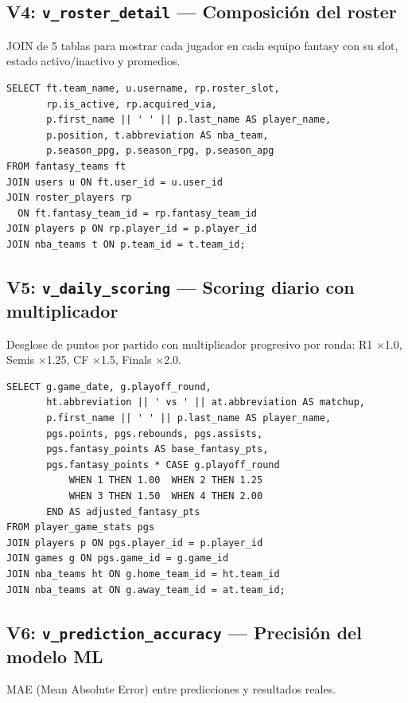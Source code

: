 \documentclass[12pt,a4paper]{article}
\begin{document}
\subsection{V4: \texttt{v\_roster\_detail} --- Composici\'on del roster}

JOIN de 5 tablas para mostrar cada jugador en cada equipo fantasy con su slot,
estado activo/inactivo y promedios.

\begin{lstlisting}
SELECT ft.team_name, u.username, rp.roster_slot,
       rp.is_active, rp.acquired_via,
       p.first_name || ' ' || p.last_name AS player_name,
       p.position, t.abbreviation AS nba_team,
       p.season_ppg, p.season_rpg, p.season_apg
FROM fantasy_teams ft
JOIN users u ON ft.user_id = u.user_id
JOIN roster_players rp
  ON ft.fantasy_team_id = rp.fantasy_team_id
JOIN players p ON rp.player_id = p.player_id
JOIN nba_teams t ON p.team_id = t.team_id;
\end{lstlisting}

\subsection{V5: \texttt{v\_daily\_scoring} --- Scoring diario con multiplicador}

Desglose de puntos por partido con multiplicador progresivo por ronda:
R1 $\times$1.0, Semis $\times$1.25, CF $\times$1.5, Finals $\times$2.0.

\begin{lstlisting}
SELECT g.game_date, g.playoff_round,
       ht.abbreviation || ' vs ' || at.abbreviation AS matchup,
       p.first_name || ' ' || p.last_name AS player_name,
       pgs.points, pgs.rebounds, pgs.assists,
       pgs.fantasy_points AS base_fantasy_pts,
       pgs.fantasy_points * CASE g.playoff_round
           WHEN 1 THEN 1.00  WHEN 2 THEN 1.25
           WHEN 3 THEN 1.50  WHEN 4 THEN 2.00
       END AS adjusted_fantasy_pts
FROM player_game_stats pgs
JOIN players p ON pgs.player_id = p.player_id
JOIN games g ON pgs.game_id = g.game_id
JOIN nba_teams ht ON g.home_team_id = ht.team_id
JOIN nba_teams at ON g.away_team_id = at.team_id;
\end{lstlisting}

\subsection{V6: \texttt{v\_prediction\_accuracy} --- Precisi\'on del modelo ML}

MAE (Mean Absolute Error) entre predicciones y resultados reales.
\end{document}
